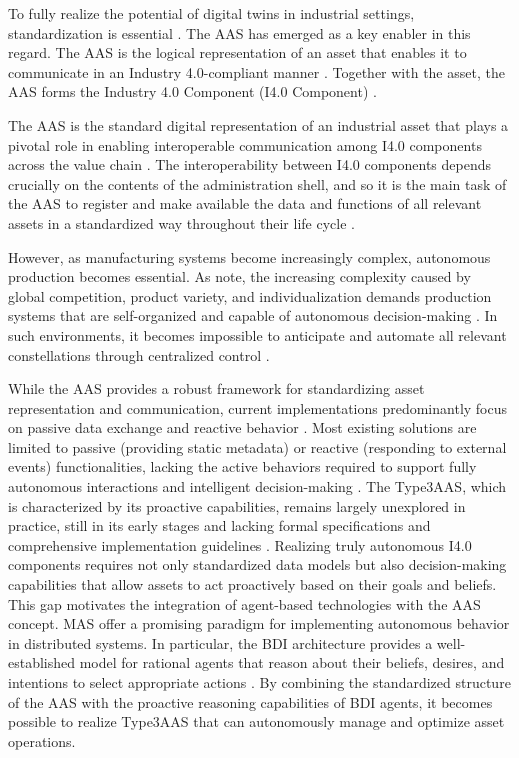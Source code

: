 To fully realize the potential of digital twins in industrial settings,
standardization is essential \cite{inigo2020towards}.
The \ac{AAS} has emerged as a key enabler in this regard.
The \ac{AAS} is the logical representation of an asset that enables it to communicate in an Industry 4.0-compliant manner \cite{inigo2020towards}.
Together with the asset, the \ac{AAS} forms the Industry 4.0 Component (I4.0 Component) \cite{inigo2020towards}.

The \ac{AAS} is the standard digital representation of an industrial asset that plays a pivotal role in enabling interoperable communication among \ac{I4.0} components across the value chain \cite{inigo2020towards}.
The interoperability between I4.0 components depends crucially on the contents of the administration shell,
and so it is the main task of the \ac{AAS} to register and make available the data and functions of all relevant assets in a standardized way throughout their life cycle \cite{wei2019review}.

However, as manufacturing systems become increasingly complex, autonomous production becomes essential.
As \cite{wang2016implementing} note, the increasing complexity caused by global competition, product variety, 
and individualization demands production systems that are self-organized and capable of autonomous 
decision-making \cite{wang2016implementing}. In such environments, it becomes impossible to anticipate and 
automate all relevant constellations through centralized control \cite{antons2024designing}.


While the \ac{AAS} provides a robust framework for standardizing asset representation and communication,
current implementations predominantly focus on passive data exchange and reactive behavior \cite{leitao2025role}.
Most existing solutions are limited to passive (providing static metadata) or reactive (responding to external events) functionalities,
lacking the active behaviors required to support fully autonomous interactions and intelligent decision-making \cite{pereira2025aas}.
The \ac{Type3AAS}, which is characterized by its proactive capabilities, remains largely unexplored in practice,
still in its early stages and lacking formal specifications and comprehensive implementation guidelines \cite{leitao2025role}.
Realizing truly autonomous \ac{I4.0} components requires not only standardized data models but also 
decision-making capabilities that allow assets to act proactively based on their goals and beliefs.
This gap motivates the integration of agent-based technologies with the \ac{AAS} concept.
\ac{MAS} offer a promising paradigm for implementing autonomous behavior in distributed systems.
In particular, the \ac{BDI} architecture provides a well-established model for rational agents 
that reason about their beliefs, desires, and intentions to select appropriate actions \cite{rao1995bdi}.
By combining the standardized structure of the \ac{AAS} with the proactive reasoning capabilities of \ac{BDI} agents,
it becomes possible to realize \ac{Type3AAS} that can autonomously manage and optimize asset operations.

